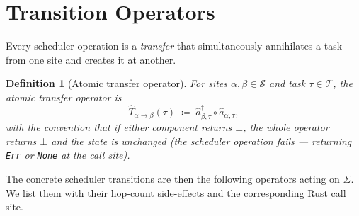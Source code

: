 \documentclass[11pt,a4paper]{article}
\newtheorem{definition}{Definition}[section]
\newcommand{\cre}[1]{\hat{a}^{\dagger}_{#1}}
\newcommand{\ann}[1]{\hat{a}_{#1}}
\newcommand{\Trf}[2]{\hat{T}_{#1 \to #2}}
\newcommand{\code}[1]{\texttt{#1}}
\begin{document}
\section{Transition Operators}

Every scheduler operation is a \emph{transfer} that simultaneously
annihilates a task from one site and creates it at another.

\begin{definition}[Atomic transfer operator]
\label{def:transfer}
For sites $\alpha, \beta \in \mathcal{S}$ and task $\tau \in
\mathcal{T}$, the \emph{atomic transfer operator} is
\[
  \Trf{\alpha}{\beta}(\tau) \;\coloneqq\;
  \cre{\beta,\tau} \circ \ann{\alpha,\tau},
\]
with the convention that if either component returns $\bot$, the
whole operator returns $\bot$ and the state is unchanged (the
scheduler operation fails --- returning \code{Err} or \code{None}
at the call site).
\end{definition}

The concrete scheduler transitions are then the following operators
acting on $\Sigma$.  We list them with their hop-count side-effects
and the corresponding Rust call site.
\end{document}
